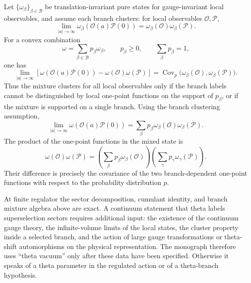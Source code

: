 \begin{remark}
\label{rem:theta-branch-mixture-cluster-test}
Let \(\{\omega_\beta\}_{\beta\in\mathcal B}\) be translation-invariant pure
states for gauge-invariant local observables, and assume each branch clusters:
for local observables \(\mathcal O,\mathcal P\),
\begin{equation}
  \lim_{|a|\to\infty}
  \omega_\beta(\mathcal O(a)\mathcal P(0))
  =
  \omega_\beta(\mathcal O)\omega_\beta(\mathcal P).
  \label{eq:branch-clustering-assumption}
\end{equation}
For a convex combination
\begin{equation}
  \omega=\sum_{\beta\in\mathcal B}p_\beta\omega_\beta,
  \qquad
  p_\beta\ge0,
  \qquad
  \sum_\beta p_\beta=1,
  \label{eq:theta-branch-mixture-state}
\end{equation}
one has
\begin{equation}
  \lim_{|a|\to\infty}
  \left[
    \omega(\mathcal O(a)\mathcal P(0))
    -
    \omega(\mathcal O)\omega(\mathcal P)
  \right]
  =
  \operatorname{Cov}_{p}
  \bigl(\omega_\beta(\mathcal O),\omega_\beta(\mathcal P)\bigr).
  \label{eq:theta-branch-cluster-covariance}
\end{equation}
Thus the mixture clusters for all local observables only if the branch labels
cannot be distinguished by local one-point functions on the support of
\(p_\beta\), or if the mixture is supported on a single branch.
Using the branch clustering assumption,
\[
  \lim_{|a|\to\infty}
  \omega(\mathcal O(a)\mathcal P(0))
  =
  \sum_\beta p_\beta
  \omega_\beta(\mathcal O)\omega_\beta(\mathcal P).
  \]
The product of the one-point functions in the mixed state is
\[
  \omega(\mathcal O)\omega(\mathcal P)
  =
  \left(\sum_\beta p_\beta\omega_\beta(\mathcal O)\right)
  \left(\sum_\gamma p_\gamma\omega_\gamma(\mathcal P)\right).
  \]
Their difference is precisely the covariance of the two branch-dependent
one-point functions with respect to the probability distribution \(p\).
\end{remark}

\begin{remark}
\label{rem:theta-vacua-status}
At finite regulator the sector decomposition, cumulant identity, and branch
mixture algebra above are exact.  A continuum statement that theta labels
superselection sectors requires additional input: the existence of the
continuum gauge theory, the infinite-volume limits of the local states, the
cluster property inside a selected branch, and the action of large gauge
transformations or theta-shift automorphisms on the physical representation.
The monograph therefore uses ``theta vacuum'' only after these data have been
specified.  Otherwise it speaks of a theta parameter in the regulated action
or of a theta-branch hypothesis.
\end{remark}

